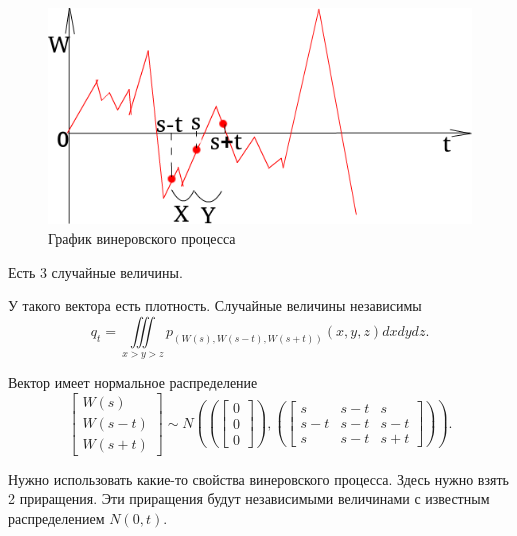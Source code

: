 \begin{figure}[h!]
  \centering
  \includegraphics[width=.4\textwidth]{./pictures/5_6.png}
  \caption{График винеровского процесса}
  \label{fig:56}
\end{figure}

Есть 3 случайные величины.

У такого вектора есть плотность.
Случайные величины независимы
$$q_t =
  \iiint \limits_{x > y > z}
    p_{ \left( W \left( s \right), W \left( s - t \right), W \left( s + t \right) \right) }
      \left( x, y, z \right) dxdydz.$$

Вектор имеет нормальное распределение
$$ \begin{bmatrix}
    W \left( s \right) \\
    W \left( s - t \right) \\
    W \left( s + t \right)
  \end{bmatrix} \sim
  N \left(
    \left( \begin{bmatrix}
      0 \\
      0 \\
      0
    \end{bmatrix} \right),
    \left( \begin{bmatrix}
      s & s - t & s \\
      s - t & s - t & s - t \\
      s & s - t & s + t
    \end{bmatrix} \right) \right).$$

Нужно использовать какие-то свойства винеровского процесса.
Здесь нужно взять 2 приращения.
Эти приращения будут независимыми величинами с известным распределением $N \left( 0, t \right) $.

